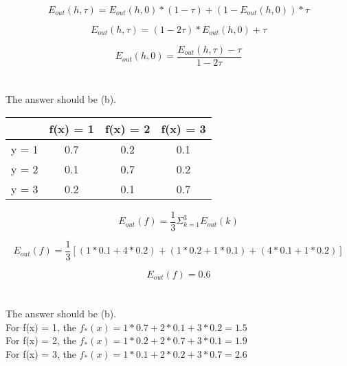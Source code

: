 \documentclass{article}
\begin{document}
\begin{CJK*}{UTF8}{bsmi}
\begin{displaymath} 
	E_{out}(h, \tau) = E_{out}(h, 0) * (1 - \tau) + (1 - E_{out}(h, 0)) * \tau
\end{displaymath}  

\begin{displaymath} 
	E_{out}(h, \tau) =  (1 - 2\tau)  * E_{out}(h, 0) + \tau
\end{displaymath}  

\begin{displaymath} 
	E_{out}(h, 0) =  \frac{E_{out}(h, \tau) - \tau}{1 - 2\tau}
\end{displaymath}  

\section{}%
The answer should be (b). 
\begin{center}
	\begin{tabular}{c|c|c|c}
& f(x) = 1 & f(x) = 2 & f(x) = 3 \\ \hline
	y = 1                 & 0.7      & 0.2      & 0.1      \\ \hline
	y = 2                 & 0.1      & 0.7      & 0.2      \\ \hline
	y = 3                 & 0.2      & 0.1      & 0.7     
	\end{tabular}
\end{center}
 
\begin{displaymath} 
	E_{out}(f) = \frac{1}{3} \Sigma_{k = 1}^3 E_{out}(k) 
\end{displaymath}  

\begin{displaymath} 
	E_{out}(f) = \frac{1}{3} [(1 * 0.1 + 4 * 0.2) + (1 * 0.2 + 1 * 0.1) + (4 * 0.1 + 1 * 0.2)]
\end{displaymath}  

\begin{displaymath} 
 E_{out}(f) = 0.6
\end{displaymath}  

\section{}%
The answer should be (b).\\
 For f(x) = 1, the $f_*(x) = 1 * 0.7 + 2 * 0.1 + 3 * 0.2  = 1.5$ \\
 For f(x) = 2, the $f_*(x) = 1 * 0.2 + 2 * 0.7 + 3 * 0.1  = 1.9$ \\
 For f(x) = 3, the $f_*(x) = 1 * 0.1 + 2 * 0.2 + 3 * 0.7  = 2.6$
 

\end{CJK*}
\end{document}

